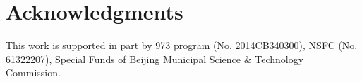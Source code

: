 \documentclass[10pt,journal,compsoc,twoside]{IEEEtran}
\newcounter{definition}[section]
\newcounter{alg}[section]
\begin{document}
%














\section*{Acknowledgments}
This work is supported in part by  973 program ({\small No. 2014CB340300}), NSFC ({\small No. 61322207}), Special Funds of Beijing Municipal Science \& Technology Commission.

\balance





%
%
%



\end{document}
